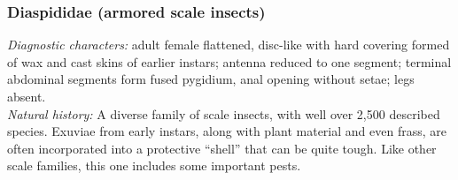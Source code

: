 \documentclass[letterpaper, 11pt]{article}
\begin{document}
\subsubsection{Diaspididae (armored scale insects)}
\noindent{}\textit{Diagnostic characters:} adult female flattened, disc-like with hard covering formed of wax and cast skins of earlier instars; antenna reduced to one segment; terminal abdominal segments form fused pygidium, anal opening without setae; legs absent.\\

\noindent{}\textit{Natural history:} A diverse family of scale insects, with well over 2,500 described species. Exuviae from early instars, along with plant material and even frass, are often incorporated into a protective ``shell'' that can be quite tough. Like other scale families, this one includes some important pests.\\
\end{document}
